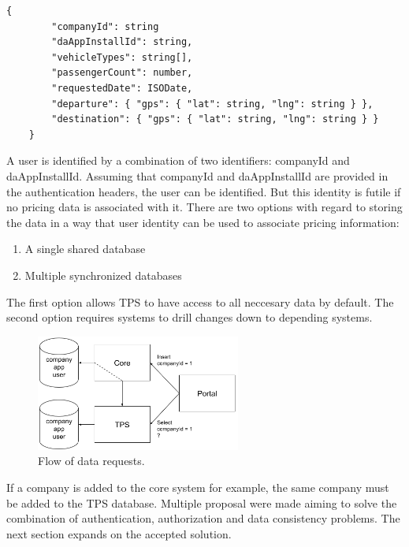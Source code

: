 \begin{lstlisting}[caption={Minimal external information required for a trip price calculation.}, label={lst:request}]
	{
		"companyId": string
		"daAppInstallId": string,
		"vehicleTypes": string[],
		"passengerCount": number,
		"requestedDate": ISODate,
		"departure": { "gps": { "lat": string, "lng": string } },
		"destination": { "gps": { "lat": string, "lng": string } }
	}
\end{lstlisting}

A user is identified by a combination of two identifiers: companyId and daAppInstallId. Assuming that companyId and daAppInstallId are provided in the authentication headers, the user can be identified. But this identity is futile if no pricing data is associated with it. There are two options with regard to storing the data in a way that user identity can be used to associate pricing information:

\begin{enumerate}
	\item A single shared database
	\item Multiple synchronized databases
\end{enumerate}

The first option allows TPS to have access to all neccesary data by default. The second option requires systems to drill changes down to depending systems.

\begin{figure}[H]
	\centering
	\includegraphics[width=0.6\textwidth]{DataSync}
	\caption[DataSync]{Flow of data requests.}
	\label{fig:DataSync}
\end{figure}

If a company is added to the core system for example, the same company must be added to the TPS database. Multiple proposal were made aiming to solve the combination of authentication, authorization and data consistency problems. The next section expands on the accepted solution.

%
